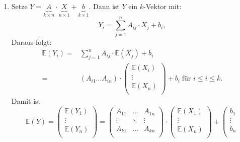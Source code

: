 \documentclass[10pt]{article}
\newcommand{\EW}{\mathbb{E}} %
\newenvironment{BWS}[1][]
{\begin{Beweis}[frametitle=#1]}{\end{Beweis}}
\begin{document}
			\begin{BWS}[Beweis 3.0.1 (Linearität des Erwartungswertes)]
				\begin{enumerate}
					\item Setze $Y = \underbrace{A}_{k\times n} \cdot \underbrace{X}_{n\times1}+\underbrace{b}_{k \times 1}$. Dann ist $Y$ ein $k$-Vektor mit:
					\begin{equation*}
						Y_i = \sum_{j=1}^{n} A_{ij} \cdot X_j + b_i,
					\end{equation*}
					Daraus folgt:
					\begin{equation*}
						\begin{split}
						\EW(Y_i) =& \sum_{j=1}^{n} A_{ij} \cdot \EW(X_j) + b_i\\
						=& (A_{i1} \ldots A_{in}) \cdot \left(
						\begin{array}{c}
							\EW(X_i)\\
							\vdots\\
							\EW(X_n)\\
						\end{array}
						\right) + b_i \; \text{für $i\leq i \leq k$}.
						\end{split}
					\end{equation*}
					Damit ist
					\begin{equation*}
						\EW(Y) = \left(
						\begin{array}{c}
							\EW(Y_1)\\
							\vdots\\
							\EW(Y_n)\\
						\end{array}
						\right) = \begin{pmatrix}
							A_{11} & \ldots & A_{1n}\\
							\vdots & \ddots & \vdots\\
							A_{k1} & \ldots & A_{kn}\\
						\end{pmatrix} \cdot \left(
						\begin{array}{c}
						\EW(X_1)\\
						\vdots\\
						\EW(X_n)\\
						\end{array}
						\right) + \left(
						\begin{array}{c}
							b_1\\
							\vdots\\
							b_n\\
						\end{array}

\end{equation*}
\end{enumerate}
\end{BWS}
\end{document}
